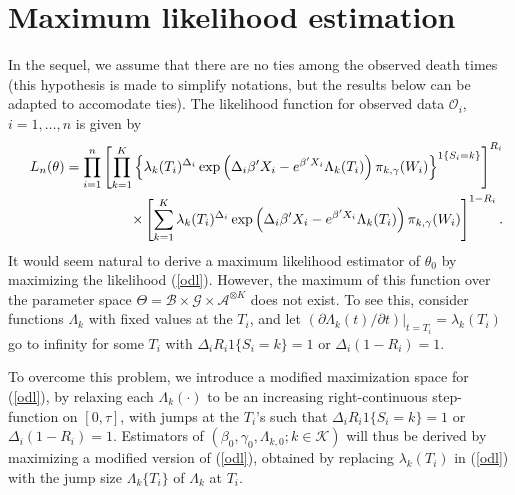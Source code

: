 \documentclass{statsoc}
\begin{document}
\section{Maximum likelihood estimation}\label{npmldesc}

In the sequel, we assume that there are no ties among the observed death times (this hypothesis is made to simplify notations, but the results below can be adapted to accomodate ties). The likelihood function for observed data  $\mathcal O_i$, $i=1,\ldots,n$ is given by
\begin{eqnarray}\label{odl}
&&L_n(\theta)=\prod_{i=1}^n \left[\prod_{k=1}^K\left\{\lambda_k(T_i)^{\Delta_i}\exp\left(\Delta_i\beta'X_i-e^{\beta'X_i} \Lambda_k(T_i)\right)\pi_{k,\gamma}(W_i)\right\}^{1\{S_i=k\}}\right]^{R_i}\nonumber\\
&&\hspace{2.5cm}\times\left[\sum_{k=1}^K\lambda_k(T_i)^{\Delta_i}\exp\left(\Delta_i\beta'X_i-e^{\beta'X_i} \Lambda_k(T_i)\right)\pi_{k,\gamma}(W_i)\right]^{1-R_i}.
\end{eqnarray}
It would seem natural to derive a maximum likelihood estimator of $\theta_0$ by maximizing the likelihood (\ref{odl}). However, the maximum of this function over the parameter space $\Theta=\mathcal B \times \mathcal G\times \mathcal A^{\otimes K}$ does not exist. To see this, consider functions $\Lambda_k$ with fixed values at the $T_i$, and let $(\partial\Lambda_k(t)\slash\partial t)|_{t=T_i}=\lambda_k(T_i)$ go to infinity for some $T_i$ with $\Delta_iR_i1\{S_i=k\}=1$ or $\Delta_i(1-R_i)=1$.

To overcome this problem, we introduce a modified maximization space for (\ref{odl}), by relaxing each $\Lambda_k(\cdot)$ to be an increasing right-continuous step-function on $[0,\tau]$, with jumps at the $T_i$'s such that $\Delta_iR_i1\{S_i=k\}=1$ or $\Delta_i(1-R_i)=1$. Estimators of $(\beta_0, \gamma_0, \Lambda_{k,0}; k\in\mathcal K)$ will thus be derived by maximizing a modified version of (\ref{odl}), obtained by replacing $\lambda_k(T_i)$ in (\ref{odl}) with the jump size $\Lambda_k\{T_i\}$ of $\Lambda_k$ at $T_i$.
\end{document}
